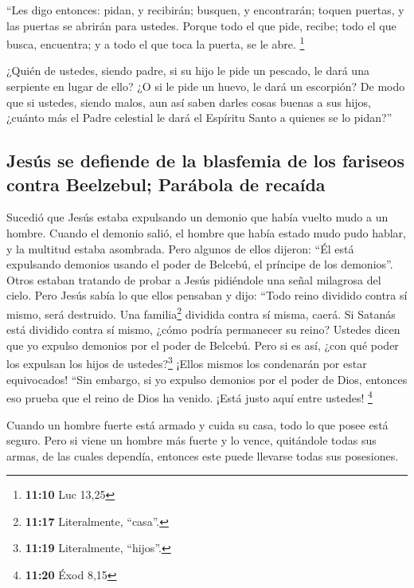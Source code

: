  ``Les digo entonces: pidan, y recibirán; busquen, y
encontrarán; toquen puertas, y las puertas se abrirán para ustedes.
 Porque todo el que pide, recibe; todo el que busca,
encuentra; y a todo el que toca la puerta, se le abre. \footnote{\textbf{11:10}
  Luc 13,25}

 ¿Quién de ustedes, siendo padre, si su hijo le pide un
pescado, le dará una serpiente en lugar de ello?  ¿O si
le pide un huevo, le dará un escorpión?  De modo que si
ustedes, siendo malos, aun así saben darles cosas buenas a sus hijos,
¿cuánto más el Padre celestial le dará el Espíritu Santo a quienes se lo
pidan?''

\hypertarget{jesuxfas-se-defiende-de-la-blasfemia-de-los-fariseos-contra-beelzebul-paruxe1bola-de-recauxedda}{%
\subsection{Jesús se defiende de la blasfemia de los fariseos contra
Beelzebul; Parábola de
recaída}\label{jesuxfas-se-defiende-de-la-blasfemia-de-los-fariseos-contra-beelzebul-paruxe1bola-de-recauxedda}}

 Sucedió que Jesús estaba expulsando un demonio que había
vuelto mudo a un hombre. Cuando el demonio salió, el hombre que había
estado mudo pudo hablar, y la multitud estaba asombrada. 
Pero algunos de ellos dijeron: ``Él está expulsando demonios usando el
poder de Belcebú, el príncipe de los demonios''.  Otros
estaban tratando de probar a Jesús pidiéndole una señal milagrosa del
cielo.  Pero Jesús sabía lo que ellos pensaban y dijo:
``Todo reino dividido contra sí mismo, será destruido. Una
familia\footnote{\textbf{11:17} Literalmente, ``casa''.} dividida contra
sí misma, caerá.  Si Satanás está dividido contra sí
mismo, ¿cómo podría permanecer su reino? Ustedes dicen que yo expulso
demonios por el poder de Belcebú.  Pero si es así, ¿con
qué poder los expulsan los hijos de ustedes?\footnote{\textbf{11:19}
  Literalmente, ``hijos''.} ¡Ellos mismos los condenarán por estar
equivocados!  ``Sin embargo, si yo expulso demonios por
el poder de Dios, entonces eso prueba que el reino de Dios ha venido.
¡Está justo aquí entre ustedes! \footnote{\textbf{11:20} Éxod 8,15}

 Cuando un hombre fuerte está armado y cuida su casa,
todo lo que posee está seguro.  Pero si viene un hombre
más fuerte y lo vence, quitándole todas sus armas, de las cuales
dependía, entonces este puede llevarse todas sus posesiones.

